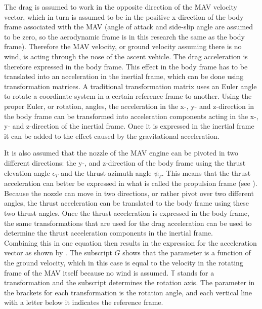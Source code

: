 The drag is assumed to work in the opposite direction of the \ac{MAV} velocity vector, which in turn is assumed to be in the positive x-direction of the body frame associated with the \ac{MAV} (angle of attack and side-slip angle are assumed to be zero, so the aerodynamic frame is in this research the same as the body frame). Therefore the \ac{MAV} velocity, or ground velocity assuming there is no wind, is acting through the nose of the ascent vehicle. The drag acceleration is therefore expressed in the body frame. This effect in the body frame has to be translated into an acceleration in the inertial frame, which can be done using transformation matrices. A traditional transformation matrix uses an Euler angle to rotate a coordinate system in a certain reference frame to another. Using the proper Euler, or rotation, angles, the acceleration in the x-, y- and z-direction in the body frame can be transformed into acceleration components acting in the x-, y- and z-direction of the inertial frame. Once it is expressed in the inertial frame it can be added to the effect caused by the gravitational acceleration. 

It is also assumed that the nozzle of the \ac{MAV} engine can be pivoted in two different directions: the y-, and z-direction of the body frame using the thrust elevation angle $\epsilon_{T}$ and the thrust azimuth angle $\psi_{T}$. This means that the thrust acceleration can better be expressed in what is called the propulsion frame (see ). Because the nozzle can move in two directions, or rather pivot over two different angles, the thrust acceleration can be translated to the body frame using these two thrust angles. Once the thrust acceleration is expressed in the body frame, the same transformations that are used for the drag acceleration can be used to determine the thrust acceleration components in the inertial frame. \\

\noindent
Combining this in one equation then results in the expression for the acceleration vector as shown by . The subscript $G$ shows that the parameter is a function of the ground velocity, which in this case is equal to the velocity in the rotating frame of the \ac{MAV} itself because no wind is assumed. $\mathbb{T}$ stands for a transformation and the subscript determines the rotation axis. The parameter in the brackets for each transformation is the rotation angle, and each vertical line with a letter below it indicates the reference frame. 

